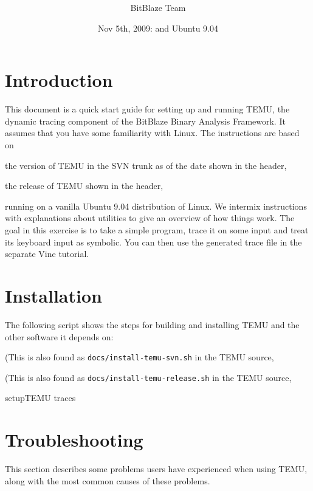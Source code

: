 \documentclass[11pt,onecolumn]{article}
\title{\mbox{}\\[-.8in]\bf \titled}
\author{BitBlaze Team}
\date{Nov 5th, 2009:
\sreither{SVN trunk r1727}{Release 1.0}
and Ubuntu 9.04}
\begin{document}
\maketitle

\tableofcontents

\section{Introduction}

This document is a quick start guide for setting up and running TEMU,
the dynamic tracing component of the BitBlaze Binary Analysis
Framework. It assumes that you have some familiarity with Linux.  The
instructions are based on
\begin{svn}
the version of TEMU in the SVN trunk as of
the date shown in the header,
\end{svn}
\begin{release}
the release of TEMU shown in the header,
\end{release}
running on a vanilla Ubuntu 9.04
distribution of Linux. We intermix instructions with explanations
about utilities to give an overview of how things work. The goal in
this exercise is to take a simple program, trace it on some input and
treat its keyboard input as symbolic. You can then use the generated
trace file in the separate Vine tutorial.

\section {\label{sec:install}Installation}

The following script shows the steps for
building and installing TEMU and the other software it depends on:
\begin{svn}
(This is also found as
\verb'docs/install-temu-svn.sh' in the TEMU source, 

\end{svn}
\begin{release}
(This is also found as
\verb'docs/install-temu-release.sh' in the TEMU source, 

\end{release}

 {setupTEMU}
 {traces}

\section {Troubleshooting}
This section describes some problems users have experienced when using TEMU, 
along with the most common causes of these problems.
\end{document}

